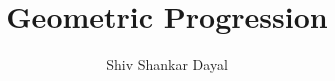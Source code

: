 \documentclass[aspectratio=1610,8pt]{beamer}
\title{Geometric Progression}
\author[Shiv Shankar Dayal]{Shiv Shankar Dayal}
\begin{document}
\begin{frame}
       \titlepage
\end{frame}
\end{document}
